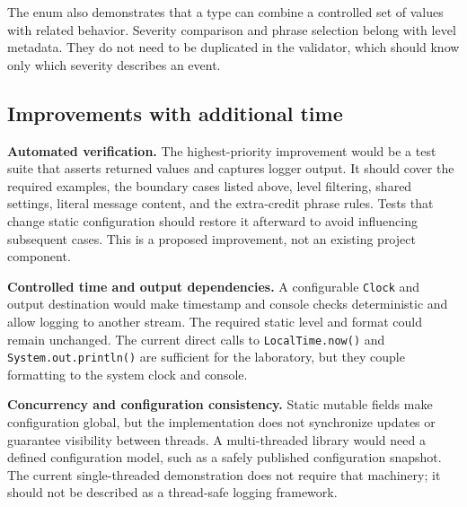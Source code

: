 \documentclass[12pt,a4paper]{article}
\newcommand{\code}[1]{\texttt{#1}}
\begin{document}
The enum also demonstrates that a type can combine a controlled set of values with related behavior. Severity comparison and phrase selection belong with level metadata. They do not need to be duplicated in the validator, which should know only which severity describes an event.

\subsection{Improvements with additional time}
\textbf{Automated verification.} The highest-priority improvement would be a test suite that asserts returned values and captures logger output. It should cover the required examples, the boundary cases listed above, level filtering, shared settings, literal message content, and the extra-credit phrase rules. Tests that change static configuration should restore it afterward to avoid influencing subsequent cases. This is a proposed improvement, not an existing project component.

\textbf{Controlled time and output dependencies.} A configurable \code{Clock} and output destination would make timestamp and console checks deterministic and allow logging to another stream. The required static level and format could remain unchanged. The current direct calls to \code{LocalTime.now()} and \code{System.out.println()} are sufficient for the laboratory, but they couple formatting to the system clock and console.

\textbf{Concurrency and configuration consistency.} Static mutable fields make configuration global, but the implementation does not synchronize updates or guarantee visibility between threads. A multi-threaded library would need a defined configuration model, such as a safely published configuration snapshot. The current single-threaded demonstration does not require that machinery; it should not be described as a thread-safe logging framework.
\end{document}
